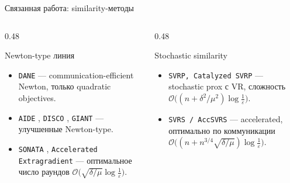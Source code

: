 \documentclass[10pt,aspectratio=169,t]{beamer}
\begin{document}




\begin{frame}{Связанная работа: similarity-методы}
\begin{columns}[T,onlytextwidth]
\begin{column}{0.48\textwidth}
\begin{block}{Newton-type линия}
\begin{itemize}
  \item \texttt{DANE} \citep{shamir2014communication} — communication-efficient Newton, только quadratic objectives.
  \item \texttt{AIDE} \citep{reddi2016aide}, \texttt{DISCO} \citep{pmlr-v37-zhangb15}, \texttt{GIANT} \citep{wang2018giant} — улучшенные Newton-type.
  \item \texttt{SONATA} \citep{sun2022distributed}, \texttt{Accelerated Extragradient} \citep{kovalev2022optimal} — оптимальное число раундов $\mathcal{O}\!\bigl(\sqrt{\delta/\mu}\log\tfrac{1}{\varepsilon}\bigr)$.
\end{itemize}
\end{block}
\end{column}

\begin{column}{0.48\textwidth}
\begin{block}{Stochastic similarity}
\begin{itemize}
  \item \texttt{SVRP, Catalyzed SVRP} \citep{khaled2022faster} — stochastic prox с VR, сложность $\mathcal{O}\bigl((n+\delta^2/\mu^2)\log\tfrac{1}{\varepsilon}\bigr)$.
  \item \texttt{SVRS / AccSVRS} \citep{lin2023stochastic} — accelerated, оптимально по коммуникации $\mathcal{O}\bigl((n + n^{3/4}\sqrt{\delta/\mu})\log\tfrac{1}{\varepsilon}\bigr)$.
\end{itemize}
\end{block}

\end{column}
\end{columns}
\end{frame}
\end{document}

